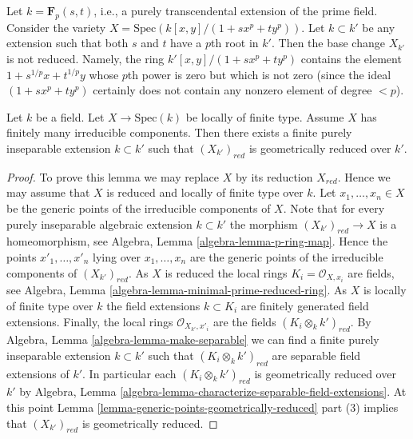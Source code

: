 \begin{example}
\label{example-not-geometrically-reduced}
Let $k = \mathbf{F}_p(s, t)$, i.e., a purely transcendental extension
of the prime field. Consider the variety
$X = \text{Spec}(k[x, y]/(1 + sx^p + ty^p))$.
Let $k \subset k'$ be any extension such that
both $s$ and $t$ have a $p$th root in $k'$.
Then the base change $X_{k'}$ is not reduced.
Namely, the ring $k'[x, y]/(1 + s x^p + ty^p)$ contains the element
$1 + s^{1/p}x + t^{1/p}y$ whose $p$th power is zero but
which is not zero (since the ideal $(1 + sx^p + ty^p)$ certainly
does not contain any nonzero element of degree $< p$).
\end{example}

\begin{lemma}
\label{lemma-finite-extension-geometrically-reduced}
Let $k$ be a field.
Let $X \to \text{Spec}(k)$ be locally of finite type.
Assume $X$ has finitely many irreducible components.
Then there exists a finite purely inseparable extension $k \subset k'$
such that $(X_{k'})_{red}$ is geometrically reduced over $k'$.
\end{lemma}

\begin{proof}
To prove this lemma we may replace $X$ by its reduction $X_{red}$.
Hence we may assume that $X$ is reduced and locally of finite type
over $k$.
Let $x_1, \ldots, x_n \in X$ be the generic points of the irreducible
components of $X$.
Note that for every purely inseparable algebraic extension $k \subset k'$
the morphism $(X_{k'})_{red} \to X$ is a homeomorphism, see
Algebra, Lemma \ref{algebra-lemma-p-ring-map}. Hence the points
$x'_1, \ldots, x'_n$ lying over $x_1, \ldots, x_n$ are the generic
points of the irreducible components of $(X_{k'})_{red}$.
As $X$ is reduced the local rings $K_i = \mathcal{O}_{X, x_i}$ are fields, see
Algebra, Lemma \ref{algebra-lemma-minimal-prime-reduced-ring}.
As $X$ is locally of finite type over $k$ the field extensions
$k \subset K_i$ are finitely generated field extensions.
Finally, the local rings $\mathcal{O}_{X_{k'}, x'_i}$ are the
fields $(K_i \otimes_k k')_{red}$. By
Algebra, Lemma \ref{algebra-lemma-make-separable}
we can find a finite purely inseparable extension $k \subset k'$
such that $(K_i \otimes_k k')_{red}$ are separable field
extensions of $k'$. In particular each $(K_i \otimes_k k')_{red}$
is geometrically reduced over $k'$ by
Algebra, Lemma \ref{algebra-lemma-characterize-separable-field-extensions}.
At this point
Lemma \ref{lemma-generic-points-geometrically-reduced} part (3)
implies that $(X_{k'})_{red}$ is geometrically reduced.
\end{proof}






